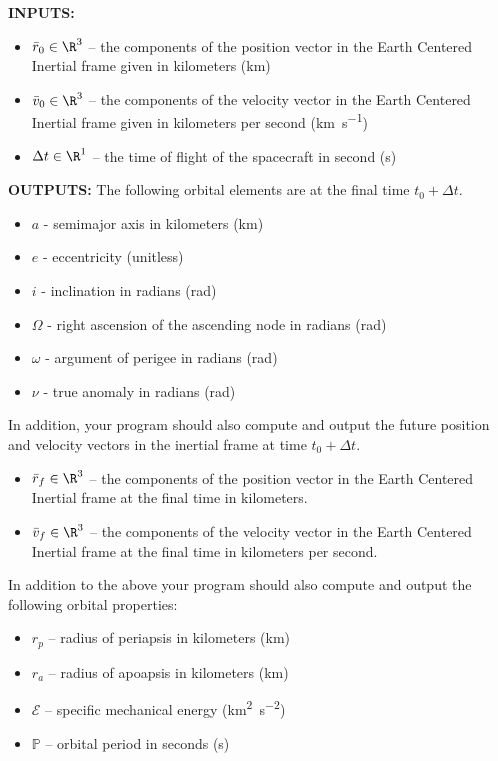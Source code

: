\documentclass[11pt, reqno]{article}    %
\begin{document}
\noindent \textbf{INPUTS:}
\begin{itemize}
    \item \( \bar r_0 \in \R^{3} \) -- the components of the position vector in the Earth Centered Inertial frame given in kilometers (\si{\kilo\meter})
    \item \( \bar v_0 \in \R^{3} \) -- the components of the velocity vector in the Earth Centered Inertial frame given in kilometers per second (\si{\kilo\meter\per\second})
    \item \( \Delta t \in \R^{1} \) -- the time of flight of the spacecraft in second (\si{\second})
\end{itemize}

\noindent \textbf{OUTPUTS:}
The following orbital elements are at the final time \( t_0 + \Delta t \).
\begin{itemize}
    \item \( a \)  - semimajor axis in kilometers (\si{\kilo\meter})
    \item \( e \) - eccentricity (unitless)
    \item \( i \) - inclination in radians (\si{\radian})
    \item \( \Omega \) - right ascension of the ascending node in radians (\si{\radian})
    \item \( \omega \) - argument of perigee in radians (\si{\radian})
    \item \( \nu \) - true anomaly in radians (\si{\radian})
\end{itemize}
In addition, your program should also compute and output the future position and velocity vectors in the inertial frame at time \( t_0 + \Delta t \).
\begin{itemize}
    \item \( \bar r_f \in \R^3 \) -- the components of the position vector in the Earth Centered Inertial frame at the final time in kilometers.
    \item \( \bar v_f \in \R^3 \) -- the components of the velocity vector in the Earth Centered Inertial frame at the final time in kilometers per second.
\end{itemize}

In addition to the above your program should also compute and output the following orbital properties:

\begin{itemize}
    \item \( r_p \) -- radius of periapsis in kilometers (\si{\kilo\meter})
    \item \( r_a \) -- radius of apoapsis in kilometers (\si{\kilo\meter})
    \item \( \mathcal{E} \) -- specific mechanical energy (\si{\kilo\meter\squared\per\second\squared})
    \item \( \mathbb{P} \) -- orbital period in seconds (\si{\second})
\end{itemize}
\end{document}
